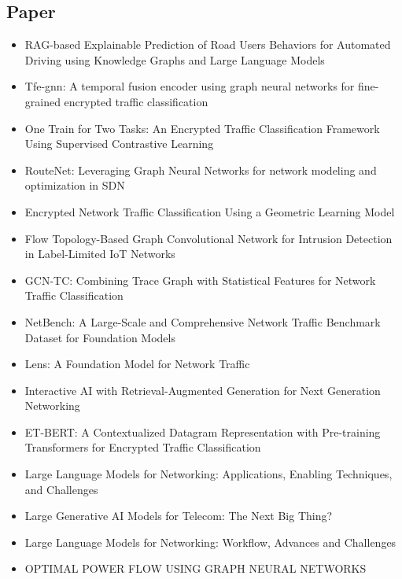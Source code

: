 \subsection{Paper}
\begin{itemize}
    \item RAG-based Explainable Prediction of Road Users Behaviors for Automated Driving using Knowledge Graphs and Large Language Models
    \item Tfe-gnn: A temporal fusion encoder using graph neural networks for fine-grained encrypted traffic classification
    \item One Train for Two Tasks: An Encrypted Traffic Classification Framework Using Supervised Contrastive Learning
    \item RouteNet: Leveraging Graph Neural Networks for network modeling and optimization in SDN
    \item Encrypted Network Traffic Classification Using a Geometric Learning Model
    \item Flow Topology-Based Graph Convolutional Network for Intrusion Detection in Label-Limited IoT Networks
    \item GCN-TC: Combining Trace Graph with Statistical Features for Network Traffic Classification
    \item NetBench: A Large-Scale and Comprehensive Network Traffic Benchmark Dataset for Foundation Models
    \item Lens: A Foundation Model for Network Traffic
    \item Interactive AI with Retrieval-Augmented Generation
for Next Generation Networking
    \item ET-BERT: A Contextualized Datagram Representation with Pre-training Transformers for Encrypted Traffic Classification
    \item Large Language Models for Networking: Applications, Enabling Techniques, and Challenges
    \item Large Generative AI Models for Telecom: The Next Big Thing?
    \item Large Language Models for Networking: Workflow, Advances and Challenges
    \item OPTIMAL POWER FLOW USING GRAPH NEURAL NETWORKS
\end{itemize}